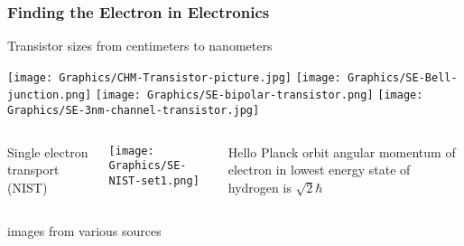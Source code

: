 
\begin{frame}
  \frametitle{Finding the Electron in Electronics}

  Transistor sizes from centimeters to nanometers
  
  \texttt{[image: Graphics/CHM-Transistor-picture.jpg]}
  \texttt{[image: Graphics/SE-Bell-junction.png]}
  \texttt{[image: Graphics/SE-bipolar-transistor.png]}
  \texttt{[image: Graphics/SE-3nm-channel-transistor.jpg]}

  \begin{columns}
    Single electron transport (NIST)
  
    \texttt{[image: Graphics/SE-NIST-set1.png]}

    \begin{block}{Hello Planck}
      orbit angular momentum of electron in lowest energy state of hydrogen
      is $\sqrt{2} \hbar$
    \end{block}
  \end{columns}

  images from various sources~\cite{CHM-Transistor-article, Lost-history-transistor, NRL-nanoelectronics,
    PhysOrg-3nm-channel-transistor, NIST-Single-electron-transport}
\end{frame}

